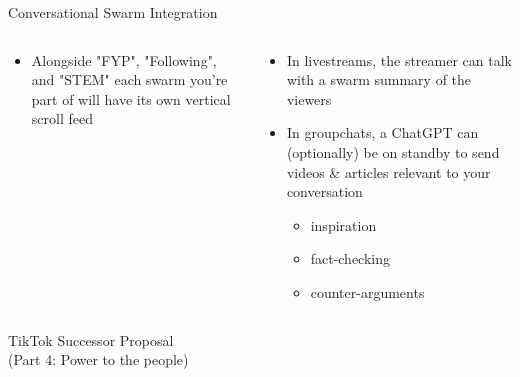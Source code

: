 \documentclass[aspectratio=169]{beamer}
\begin{document}
\begin{frame}{Conversational Swarm Integration}
\begin{columns}[T]
    \begin{column}[T]{0.5\textwidth}
        \begin{itemize}
            \item Alongside "FYP", "Following", and "STEM" each swarm you're part of will have its own vertical scroll feed
        \end{itemize}
    \end{column}
    \begin{column}{0.5\textwidth}
        \begin{itemize}
            \item In livestreams, the streamer can talk with a swarm summary of the viewers
            \item In groupchats, a ChatGPT can (optionally) be on standby to send videos \& articles relevant to your conversation
            \begin{itemize}
                \item inspiration
                \item fact-checking
                \item counter-arguments
            \end{itemize}
        \end{itemize}
    \end{column}
\end{columns}
\end{frame}

\begin{frame}
    \centering
    \Huge TikTok Successor Proposal \\
    \Huge (Part 4: Power to the people)
\end{frame}
\end{document}

